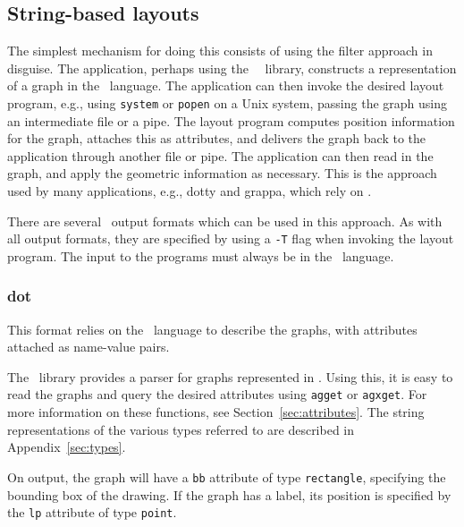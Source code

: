 \subsection{String-based layouts}
The simplest mechanism for doing this consists of using the filter
approach in disguise. The application, perhaps using the \gviz\ \graph\
library, constructs a representation of a graph in the
\DOT\ language. The application can then invoke the desired layout
program, e.g., using {\tt system} or {\tt popen} on a Unix system, 
passing the graph using an intermediate file or a pipe. The layout
program computes position information for the graph, attaches this
as attributes, and delivers the graph back to the application through
another file or pipe. The application can then read in the graph,
and apply the geometric information as necessary. This is the
approach used by many applications, e.g., dotty\cite{dotty} and
grappa\cite{grappa}, which
rely on \gviz.

There are several \gviz\ output formats which can be used in this
approach. As with all output formats, they are specified by 
using a {\tt -T} flag when invoking the layout program. 
The input to the programs must always be in the \DOT\ language.

\subsubsection{dot}
\label{sect:dot}
This format relies on the \DOT\ language to describe the graphs, with attributes
attached as name-value pairs.

The \graph\ library provides a parser for graphs represented
in \DOT. Using this, it is easy to read the graphs and query the
desired attributes using {\tt agget} or {\tt agxget}.
For more information on these functions, see Section~\ref{sec:attributes}.
The string representations of the various types referred to are
described in Appendix~\ref{sec:types}.

On output, the graph will have a {\tt bb} attribute of type {\tt rectangle}, 
specifying the bounding box of the drawing. 
If the graph has a label, its position is specified by the {\tt lp}
attribute of type {\tt point}.

